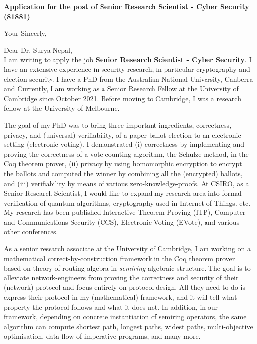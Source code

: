 \documentclass[11pt,a4paper,roman]{moderncv}
\begin{document}
\date{\today}
\opening{\textbf{Application for the post of Senior Research Scientist - Cyber Security (81881)}}
\closing{Your Sincerly, \vspace{-1em}}



\makelettertitle



Dear Dr. Surya Nepal, 
\\
\vspace{1em}
I am writing to apply
the job \textbf{Senior Research Scientist - Cyber Security}. 
I have an extensive experience in
security research, in particular cryptography and election security. 
I have a PhD from the Australian National University, Canberra
and Currently, I am working as a Senior Research Fellow at the University of 
Cambridge since October 2021. Before moving to Cambridge, I was a 
research fellow at the University of Melbourne. 

\vspace{0.5cm}
The goal of my PhD was to 
bring  three important ingredients, correctness, privacy, and (universal) verifiability, of a 
paper ballot election to an electronic setting (electronic voting). I 
demonstrated (i) correctness by implementing and proving the correctness of 
a vote-counting algorithm, the Schulze method, in the Coq theorem prover, 
(ii) privacy by using homomorphic encryption to encrypt the ballots and computed
the winner by combining all the (encrypted) ballots, and 
(iii) verifiability by means of various zero-knowledge-proofs.
At CSIRO, as a Senior Research Scientist, 
I would like to expand my research area into formal verification 
of quantum algorithms, cryptography used in Internet-of-Things, etc. 
My research has been published Interactive Theorem Proving (ITP), 
Computer and Communications Security (CCS), Electronic Voting (EVote), 
and various other conferences. 

 

\vspace{0.5cm}
As a senior research associate at the University of Cambridge, 
I am working on  
a mathematical correct-by-construction framework in the Coq theorem prover 
based on theory of routing algebra in \emph{semiring} algebraic structure.
The goal is to alleviate network-engineers from proving the 
correctness and security of their (network) protocol and focus entirely on protocol design.
All  they need to do is express their protocol in my (mathematical) 
framework, and it will 
tell what property the protocol follows and what it does not. 
In addition, in our framework, depending on concrete instantiation 
of semiring operators, the same algorithm can compute shortest path, longest paths, 
widest paths, multi-objective optimisation, data flow of imperative programs, and many more. 
\end{document}
